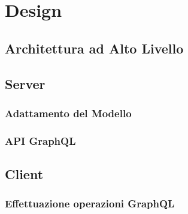 \chapter{Design}\label{chap:design}
\section{Architettura ad Alto Livello}\label{sec:architecture}
\section{Server}\label{sec:server}
\subsection{Adattamento del Modello}\label{ssec:alchemist-adaptation}
\subsection{API GraphQL}\label{ssec:server-gql-apis}
\section{Client}\label{sec:client}
\subsection{Effettuazione operazioni GraphQL}\label{ssec:client-gql-apis}

